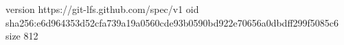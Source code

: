 version https://git-lfs.github.com/spec/v1
oid sha256:e6d964353d52cfa739a19a0560cde93b0590bd922e70656a0dbdff299f5085c6
size 812
